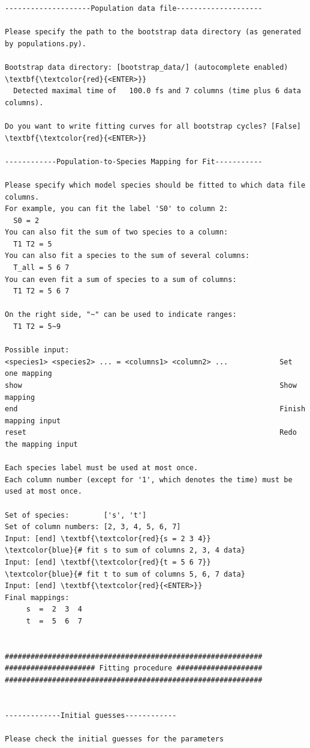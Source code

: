 \documentclass[a4paper,11pt,DIV=15,openany]{scrbook}
\begin{document}
\begin{oframed}
\begin{Verbatim}[commandchars=\\\{\}]
--------------------Population data file--------------------

Please specify the path to the bootstrap data directory (as generated by populations.py).

Bootstrap data directory: [bootstrap_data/] (autocomplete enabled) \textbf{\textcolor{red}{<ENTER>}}
  Detected maximal time of   100.0 fs and 7 columns (time plus 6 data columns).

Do you want to write fitting curves for all bootstrap cycles? [False] \textbf{\textcolor{red}{<ENTER>}}

------------Population-to-Species Mapping for Fit-----------

Please specify which model species should be fitted to which data file columns.
For example, you can fit the label 'S0' to column 2:
  S0 = 2
You can also fit the sum of two species to a column:
  T1 T2 = 5
You can also fit a species to the sum of several columns:
  T_all = 5 6 7
You can even fit a sum of species to a sum of columns:
  T1 T2 = 5 6 7

On the right side, "~" can be used to indicate ranges:
  T1 T2 = 5~9

Possible input:
<species1> <species2> ... = <columns1> <column2> ...            Set one mapping
show                                                            Show mapping
end                                                             Finish mapping input
reset                                                           Redo the mapping input

Each species label must be used at most once.
Each column number (except for '1', which denotes the time) must be used at most once.

Set of species:        ['s', 't']
Set of column numbers: [2, 3, 4, 5, 6, 7]
Input: [end] \textbf{\textcolor{red}{s = 2 3 4}}       \textcolor{blue}{# fit s to sum of columns 2, 3, 4 data}
Input: [end] \textbf{\textcolor{red}{t = 5 6 7}}       \textcolor{blue}{# fit t to sum of columns 5, 6, 7 data}
Input: [end] \textbf{\textcolor{red}{<ENTER>}}
Final mappings:
     s  =  2  3  4 
     t  =  5  6  7 


############################################################
##################### Fitting procedure ####################
############################################################


-------------Initial guesses------------

Please check the initial guesses for the parameters


\end{Verbatim}
\end{oframed}
\end{document}
